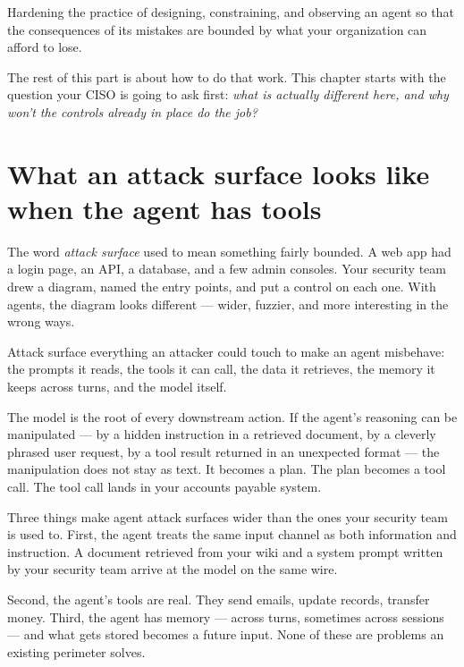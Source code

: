 \begin{TNdefinition}{Hardening}
the practice of designing, constraining, and observing an agent so that the consequences of its mistakes are bounded by what your organization can afford to lose.
\end{TNdefinition}

The rest of this part is about how to do that work. This chapter starts with the question your CISO is going to ask first: \textit{what is actually different here, and why won't the controls already in place do the job?}

\section{What an attack surface looks like when the agent has tools}

The word \textit{attack surface} used to mean something fairly bounded. A web app had a login page, an API, a database, and a few admin consoles. Your security team drew a diagram, named the entry points, and put a control on each one. With agents, the diagram looks different --- wider, fuzzier, and more interesting in the wrong ways.

\begin{TNdefinition}{Attack surface}
everything an attacker could touch to make an agent misbehave: the prompts it reads, the tools it can call, the data it retrieves, the memory it keeps across turns, and the model itself.
\end{TNdefinition}

The model is the root of every downstream action. If the agent's reasoning can be manipulated --- by a hidden instruction in a retrieved document, by a cleverly phrased user request, by a tool result returned in an unexpected format --- the manipulation does not stay as text. It becomes a plan. The plan becomes a tool call. The tool call lands in your accounts payable system.

Three things make agent attack surfaces wider than the ones your security team is used to. First, the agent treats the same input channel as both information and instruction. A document retrieved from your wiki and a system prompt written by your security team arrive at the model on the same wire.

Second, the agent's tools are real. They send emails, update records, transfer money. Third, the agent has memory --- across turns, sometimes across sessions --- and what gets stored becomes a future input. None of these are problems an existing perimeter solves.

